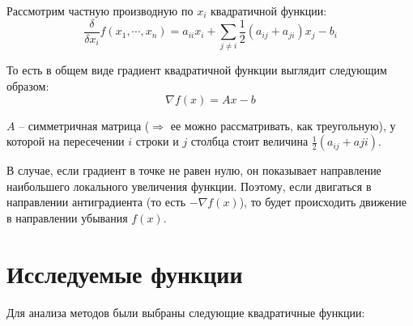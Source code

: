 \documentclass[12pt]{article}
\begin{document}
Рассмотрим частную производную по $x_i$ квадратичной функции:
\[ \frac{\delta}{\delta x_i}f(x_1, \cdots, x_n) = a_{ii}x_i + \sum_{j \neq i} \frac{1}{2} (a_{ij}+a_{ji})x_j - b_i \]

То есть в общем виде градиент квадратичной функции выглядит следующим образом:
\[ \nabla f(x) = Ax-b \]

$A$ -- симметричная матрица ($\Rightarrow$ ее можно рассматривать, как треугольную), у которой на пересечении $i$ строки и $j$ столбца стоит величина $\frac{1}{2}(a_{ij}+a{ji})$.

В случае, если градиент в точке не равен нулю, он показывает направление наибольшего локального увеличения функции. Поэтому, если двигаться в направлении антиградиента (то есть $-\nabla f(x)$), то будет происходить движение в направлении убывания $f(x)$.

\section{Исследуемые функции}

Для анализа методов были выбраны следующие квадратичные функции:
\end{document}

